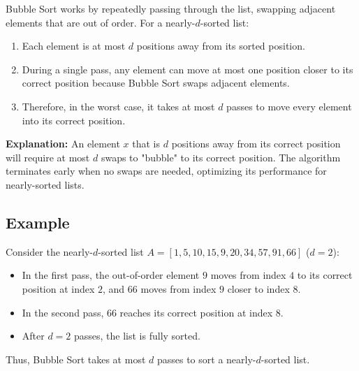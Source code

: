 \documentclass[10pt]{article}
\begin{document}
Bubble Sort works by repeatedly passing through the list, swapping adjacent elements that are out of order. For a nearly-\( d \)-sorted list:
\begin{enumerate}
  \item Each element is at most \( d \) positions away from its sorted position.
  \item During a single pass, any element can move at most one position closer to its correct position because Bubble Sort swaps adjacent elements.
  \item Therefore, in the worst case, it takes at most \( d \) passes to move every element into its correct position.
\end{enumerate}

\textbf{Explanation:} An element \( x \) that is \( d \) positions away from its correct position will require at most \( d \) swaps to "bubble" to its correct position. The algorithm terminates early when no swaps are needed, optimizing its performance for nearly-sorted lists.

\subsection*{Example}

Consider the nearly-\( d \)-sorted list \( A = [1, 5, 10, 15, 9, 20, 34, 57, 91, 66] \) (\( d = 2 \)):

\begin{itemize}
  \item In the first pass, the out-of-order element \( 9 \) moves from index \( 4 \) to its correct position at index \( 2 \), and \( 66 \) moves from index \( 9 \) closer to index \( 8 \).
  \item In the second pass, \( 66 \) reaches its correct position at index \( 8 \).
  \item After \( d = 2 \) passes, the list is fully sorted.
\end{itemize}

Thus, Bubble Sort takes at most \( d \) passes to sort a nearly-\( d \)-sorted list.
\end{document}
